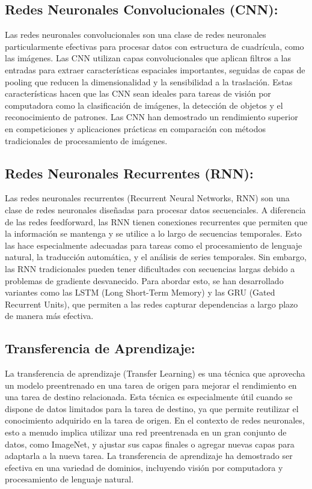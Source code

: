 \subsection{Redes Neuronales Convolucionales (CNN): }
Las redes neuronales convolucionales son una clase de redes neuronales particularmente efectivas para procesar datos con estructura de cuadrícula, como las imágenes. Las CNN utilizan capas convolucionales que aplican filtros a las entradas para extraer características espaciales importantes, seguidas de capas de pooling que reducen la dimensionalidad y la sensibilidad a la traslación. Estas características hacen que las CNN sean ideales para tareas de visión por computadora como la clasificación de imágenes, la detección de objetos y el reconocimiento de patrones. Las CNN han demostrado un rendimiento superior en competiciones y aplicaciones prácticas en comparación con métodos tradicionales de procesamiento de imágenes.
\subsection{Redes Neuronales Recurrentes (RNN): }
Las redes neuronales recurrentes (Recurrent Neural Networks, RNN) son una clase de redes neuronales diseñadas para procesar datos secuenciales. A diferencia de las redes feedforward, las RNN tienen conexiones recurrentes que permiten que la información se mantenga y se utilice a lo largo de secuencias temporales. Esto las hace especialmente adecuadas para tareas como el procesamiento de lenguaje natural, la traducción automática, y el análisis de series temporales. Sin embargo, las RNN tradicionales pueden tener dificultades con secuencias largas debido a problemas de gradiente desvanecido. Para abordar esto, se han desarrollado variantes como las LSTM (Long Short-Term Memory) y las GRU (Gated Recurrent Units), que permiten a las redes capturar dependencias a largo plazo de manera más efectiva.
\subsection{Transferencia de Aprendizaje: }
La transferencia de aprendizaje (Transfer Learning) es una técnica que aprovecha un modelo preentrenado en una tarea de origen para mejorar el rendimiento en una tarea de destino relacionada. Esta técnica es especialmente útil cuando se dispone de datos limitados para la tarea de destino, ya que permite reutilizar el conocimiento adquirido en la tarea de origen. En el contexto de redes neuronales, esto a menudo implica utilizar una red preentrenada en un gran conjunto de datos, como ImageNet, y ajustar sus capas finales o agregar nuevas capas para adaptarla a la nueva tarea. La transferencia de aprendizaje ha demostrado ser efectiva en una variedad de dominios, incluyendo visión por computadora y procesamiento de lenguaje natural.

